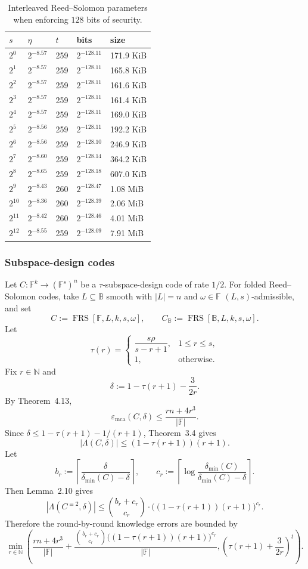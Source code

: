 \documentclass[11pt]{article}
\theoremstyle{plain}
\theoremstyle{definition}
\newcommand{\F}{\mathbb{F}}
\newcommand{\B}{\mathbb{B}}
\newcommand{\N}{\mathbb{N}}
\newcommand{\FRS}[5]{\operatorname{FRS}[#1,#2,#3,#4,#5]}
\newcommand{\epsmca}{\varepsilon_{\mathrm{mca}}}
\newcommand{\distmin}{\delta_{\min}}
\newcommand{\abs}[1]{\left|#1\right|}
\begin{document}
\begin{table}[htbp]
\centering
\begin{tabular}{lllll}
\toprule
$s$ & $\eta$ & $t$ & bits & size \\
\midrule
$2^0$ & $2^{-8.57}$ & 259 & $2^{-128.11}$ & 171.9 KiB \\
$2^1$ & $2^{-8.57}$ & 259 & $2^{-128.11}$ & 165.8 KiB \\
$2^2$ & $2^{-8.57}$ & 259 & $2^{-128.11}$ & 161.6 KiB \\
$2^3$ & $2^{-8.57}$ & 259 & $2^{-128.11}$ & 161.4 KiB \\
$2^4$ & $2^{-8.57}$ & 259 & $2^{-128.11}$ & 169.0 KiB \\
$2^5$ & $2^{-8.56}$ & 259 & $2^{-128.11}$ & 192.2 KiB \\
$2^6$ & $2^{-8.56}$ & 259 & $2^{-128.10}$ & 246.9 KiB \\
$2^7$ & $2^{-8.60}$ & 259 & $2^{-128.14}$ & 364.2 KiB \\
$2^8$ & $2^{-8.65}$ & 259 & $2^{-128.18}$ & 607.0 KiB \\
$2^9$ & $2^{-8.43}$ & 260 & $2^{-128.47}$ & 1.08 MiB \\
$2^{10}$ & $2^{-8.36}$ & 260 & $2^{-128.39}$ & 2.06 MiB \\
$2^{11}$ & $2^{-8.42}$ & 260 & $2^{-128.46}$ & 4.01 MiB \\
$2^{12}$ & $2^{-8.55}$ & 259 & $2^{-128.09}$ & 7.91 MiB \\
\bottomrule
\end{tabular}
\caption{Interleaved Reed--Solomon parameters when enforcing $128$ bits of security.}
\end{table}

\subsubsection{Subspace-design codes}

Let $C:\F^k\to(\F^s)^n$ be a $\tau$-subspace-design code of rate $1/2$. For folded Reed--Solomon codes, take $L\subseteq\B$ smooth with $\abs{L}=n$ and $\omega\in\F$ $(L,s)$-admissible, and set
\[
  C:=\FRS{\F}{L}{k}{s}{\omega},\qquad C_\B:=\FRS{\B}{L}{k}{s}{\omega}.
\]
Let
\[
  \tau(r)=\begin{cases}
  \dfrac{s\rho}{s-r+1}, & 1\le r\le s,\\[0.5em]
  1, & \text{otherwise.}
  \end{cases}
\]
Fix $r\in\N$ and
\[
  \delta:=1-\tau(r+1)-\frac{3}{2r}.
\]
By Theorem~4.13,
\[
  \epsmca(C,\delta)\le\frac{rn+4r^3}{\abs{\F}}.
\]
Since $\delta\le1-\tau(r+1)-1/(r+1)$, Theorem~3.4 gives
\[
  \abs{\Lambda(C,\delta)}\le (1-\tau(r+1))(r+1).
\]
Let
\[
  b_r:=\left\lceil\frac{\delta}{\distmin(C)-\delta}\right\rceil,
  \qquad
  c_r:=\left\lceil\log\frac{\distmin(C)}{\distmin(C)-\delta}\right\rceil.
\]
Then Lemma~2.10 gives
\[
\abs{\Lambda(C^{\equiv2},\delta)}
\le \binom{b_r+c_r}{c_r}\cdot\bigl((1-\tau(r+1))(r+1)\bigr)^{c_r}.
\]
Therefore the round-by-round knowledge errors are bounded by
\[
\min_{r\in\N}\left(
\frac{rn+4r^3}{\abs{\F}}
+\frac{\binom{b_r+c_r}{c_r}\bigl((1-\tau(r+1))(r+1)\bigr)^{c_r}}{\abs{\F}},
\left(\tau(r+1)+\frac{3}{2r}\right)^t
\right).
\]
\end{document}

